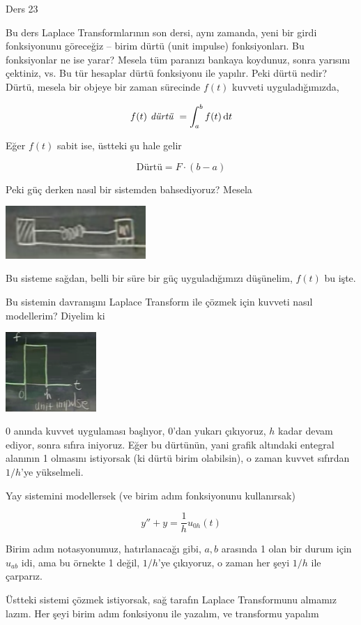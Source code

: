 \documentclass[12pt,fleqn]{article}\usepackage{../../common}
\begin{document}
Ders 23 

Bu ders Laplace Transformlarının son dersi, aynı zamanda, yeni bir girdi
fonksiyonunu göreceğiz -- birim dürtü (unit impulse) fonksiyonları. Bu
fonksiyonlar ne ise yarar? Mesela tüm paranızı bankaya koydunuz, sonra
yarısını çektiniz, vs. Bu tür hesaplar dürtü fonksiyonu ile yapılır. Peki
dürtü nedir? Dürtü, mesela bir objeye bir zaman sürecinde $f(t)$ kuvveti
uyguladığımızda,

$$ f(t) \textit{ dürtü } = \int _{a}^{b}f(t) \,\mathrm{d} t $$

Eğer $f(t)$ sabit ise, üstteki şu hale gelir

$$ \textrm{Dürtü} = F \cdot (b-a) $$

Peki güç derken nasıl bir sistemden bahsediyoruz? Mesela

\includegraphics[height=2cm]{23_1.png}

Bu sisteme sağdan, belli bir süre bir güç uyguladığımızı düşünelim, $f(t)$
bu işte. 

Bu sistemin davranışını Laplace Transform ile çözmek için kuvveti nasıl
modellerim? Diyelim ki 

\includegraphics[height=3cm]{23_2.png}

0 anında kuvvet uygulaması başlıyor, 0'dan yukarı çıkıyoruz, $h$ kadar
devam ediyor, sonra sıfıra iniyoruz. Eğer bu dürtünün, yani grafik altındaki
entegral alanının 1 olmasını istiyorsak (ki dürtü birim olabilsin), o zaman
kuvvet sıfırdan $1/h$'ye yükselmeli. 

Yay sistemini modellersek (ve birim adım fonksiyonunu kullanırsak)

$$ y'' + y  = \frac{1}{h}u_{0h}(t) $$

Birim adım notasyonumuz, hatırlanacağı gibi, $a,b$ arasında 1 olan bir
durum için $u_{ab}$ idi, ama bu örnekte 1 değil, $1/h$'ye çıkıyoruz, o
zaman her şeyi $1/h$ ile çarparız.

Üstteki sistemi çözmek istiyorsak, sağ tarafın Laplace Transformunu almamız
lazım. Her şeyi birim adım fonksiyonu ile yazalım, ve transformu yapalım
\end{document}
